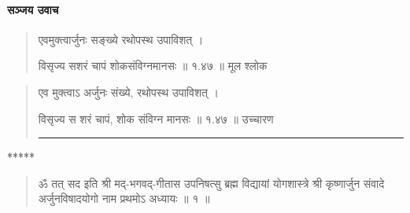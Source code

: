 \paragraph{\sanskrit सञ्जय उवाच}

\begin{quotation} 


एवमुक्त्वार्जुनः सङ्‍ख्ये रथोपस्थ उपाविशत्‌  ।  


विसृज्य सशरं चापं शोकसंविग्नमानसः  ॥ १.४७ ॥  मूल श्लोक
\end{quotation}

\begin{quotation}

एव मुक्त्वाऽ अर्जुनः संख्ये, रथोपस्थ उपाविशत्  ।  


विसृज्य स शरं चापं, शोक संविग्न मानसः  ॥ १.४७ ॥  उच्चारण

\noindent\rule{16cm}{0.4pt} 
\end{quotation}


\begin{center} ***** \end{center}
\begin{quotation}
ॐ तत् सद इति श्री मद्-भगवद्-गीतास उपनिषत्सु ब्रह्म विद्यायां योगशास्त्रे श्री कृष्णार्जुन संवादे अर्जुनविषादयोगो नाम प्रथमोऽ अध्यायः  ॥  १ ॥ 
\end{quotation}